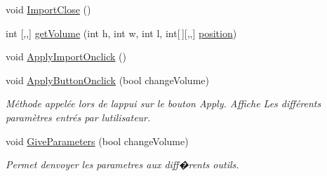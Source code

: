 \begin{DoxyCompactItemize}
void \mbox{\hyperlink{class_parameters_a95a34ed3f54953655b8caf704caff1f5}{Import\+Close}} ()
\item 
int \mbox{[},,\mbox{]} \mbox{\hyperlink{class_parameters_a5e16007361a29535bbad70f4f0a466bc}{get\+Volume}} (int h, int w, int l, int\mbox{[}$\,$\mbox{]}\mbox{[},,\mbox{]} \mbox{\hyperlink{class_parameters_ad01c1db17d90b97c666abf21a9c6fcd1}{position}})
\item 
void \mbox{\hyperlink{class_parameters_a8438e2686a572fc6d1cc2947489da01d}{Apply\+Import\+Onclick}} ()
\item 
void \mbox{\hyperlink{class_parameters_a8702daf046aa4d1c44a284c78f6ff058}{Apply\+Button\+Onclick}} (bool change\+Volume)
\begin{DoxyCompactList}\small\item\em Méthode appelée lors de l\textquotesingle{}appui sur le bouton Apply. Affiche Les différents paramètres entrés par l\textquotesingle{}utilisateur. \end{DoxyCompactList}\item 
void \mbox{\hyperlink{class_parameters_abc57bdbb6a4e2f78c7d71f1fa26b5fe8}{Give\+Parameters}} (bool change\+Volume)
\begin{DoxyCompactList}\small\item\em Permet d\textquotesingle{}envoyer les parametres aux diff�rents outils. \end{DoxyCompactList}\end{DoxyCompactItemize}
